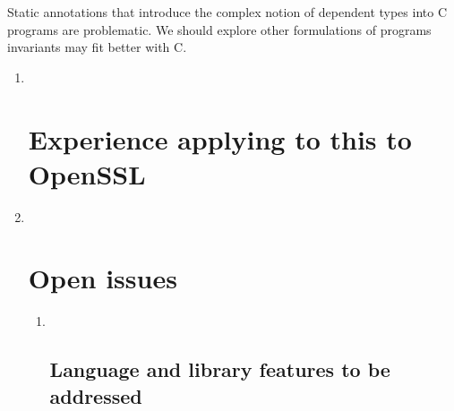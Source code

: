\documentclass[]{article}
\begin{document}
Static annotations that introduce the complex notion of dependent types
into C programs are problematic. We should explore other formulations of
programs invariants may fit better with C.

\begin{enumerate}
\def\labelenumi{\arabic{enumi}.}
\item ~
  \section{\texorpdfstring{\protect\hypertarget{ux5fRef426460697}{}{\protect\hypertarget{ux5fToc426641132}{}{\protect\hypertarget{ux5fToc435435007}{}{\protect\hypertarget{ux5fToc437460840}{}{\protect\hypertarget{ux5fToc440445521}{}{\protect\hypertarget{ux5fToc440449303}{}{\protect\hypertarget{ux5fToc440551953}{}{}}}}}}}Experience
  applying to this to
  OpenSSL}{Experience applying to this to OpenSSL}}\label{experience-applying-to-this-to-openssl}
\item ~
  \section{\texorpdfstring{\protect\hypertarget{ux5fToc422907004}{}{\protect\hypertarget{ux5fToc424307733}{}{\protect\hypertarget{ux5fRef424921851}{}{\protect\hypertarget{ux5fToc426641133}{}{\protect\hypertarget{ux5fToc435435008}{}{\protect\hypertarget{ux5fToc437460841}{}{\protect\hypertarget{ux5fToc440445522}{}{\protect\hypertarget{ux5fToc440449304}{}{\protect\hypertarget{ux5fToc440551954}{}{}}}}}}}}}Open
  issues}{Open issues}}\label{open-issues}

  \begin{enumerate}
  \def\labelenumii{\arabic{enumii}.}
  \item ~
    \subsection{\texorpdfstring{\protect\hypertarget{ux5fToc426641134}{}{\protect\hypertarget{ux5fToc435435009}{}{\protect\hypertarget{ux5fToc437460842}{}{\protect\hypertarget{ux5fToc440445523}{}{\protect\hypertarget{ux5fToc440449305}{}{\protect\hypertarget{ux5fToc440551955}{}{\protect\hypertarget{ux5fToc422907005}{}{\protect\hypertarget{ux5fToc424307734}{}{}}}}}}}}Language
    and library features to be
    addressed}{Language and library features to be addressed}}\label{language-and-library-features-to-be-addressed}
  \end{enumerate}
\end{enumerate}
\end{document}
